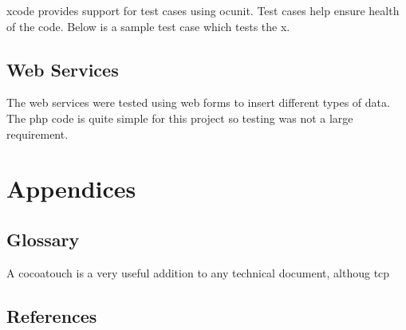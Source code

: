 \documentclass[12pt]{article}
\begin{document}
\gls{xcode} provides support for test cases using \gls{ocunit}. Test cases help ensure health of the code. Below is a sample test case which tests the x.

\subsection{Web Services}
The web services were tested using web forms to insert different types of data. The \gls{php} code is quite simple for this project so testing was not a large requirement. 

\newpage
\section{Appendices}
\subsection {Glossary}

A \gls{cocoatouch} is a very useful addition to any
technical document, althoug \gls{tcp}




\subsection {References}

\printglossaries

	
\newpage
\end{document}
